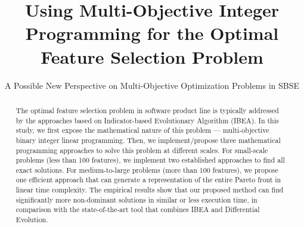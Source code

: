 \documentclass[sigconf]{acmart}
\begin{document}
\title{Using Multi-Objective Integer Programming for the Optimal Feature Selection Problem}
\subtitle{A Possible New Perspective on Multi-Objective Optimization Problems in SBSE}


%
\renewcommand{\shortauthors}{Anonymous  et al.}


\begin{abstract}
The optimal feature selection problem in software product line is typically addressed by the approaches based on Indicator-based Evolutionary Algorithm (IBEA). In this study, we first expose the mathematical nature of this problem --- multi-objective binary integer linear programming. Then, we implement/propose three mathematical programming approaches to solve this problem at different scales. For small-scale problems (less than 100 features), we implement two established approaches to find all exact solutions. For medium-to-large problems (more than 100 features), we propose one efficient approach that can generate a representation of the entire Pareto front in linear time complexity. The empirical results show that our proposed method can find significantly more non-dominant solutions in similar or less execution time, in comparison with the state-of-the-art tool that combines IBEA and Differential Evolution.%
\end{abstract}
\end{document}
